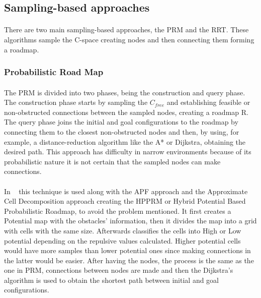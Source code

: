 \subsection{Sampling-based approaches}
\label{subsec:SB}
\paragraph{}There are two main sampling-based approaches, the \gls{PRM} and the \gls{RRT}. These algorithms sample the C-space
creating nodes and then connecting them forming a roadmap. 

\subsubsection{Probabilistic Road Map}
\label{subsubsec:PRM}
\paragraph{}The \gls{PRM} is divided into two phases, 
being the construction and query phase. The construction phase starts by sampling the $C_{free}$ and establishing feasible or non-obstructed connections between the sampled nodes, 
creating a roadmap R. The query phase joins the initial and goal configurations to the roadmap by connecting them to the closest non-obstructed nodes and then, by using, for example, 
a distance-reduction algorithm like the A* or Dijkstra, obtaining the desired path. 
This approach has difficulty in narrow environments because of its probabilistic nature it is not certain that the sampled nodes can make connections.

\paragraph{}In ~\cite{9286439} this technique is used along with the \gls{APF} approach and the Approximate Cell Decomposition approach creating the HPPRM or 
Hybrid Potential Based Probabilistic Roadmap, to avoid the problem mentioned. It first creates a Potential map with the obstacles’ information, 
then it divides the map into a grid with cells with the same size. Afterwards classifies the cells into High or Low potential depending on the repulsive values calculated. 
Higher potential cells would have more samples than lower potential ones since making connections in the latter would be easier. After having the nodes, 
the process is the same as the one in \gls{PRM}, connections between nodes are made and then the Dijkstra’s algorithm is used to obtain the shortest path between initial and 
goal configurations.

